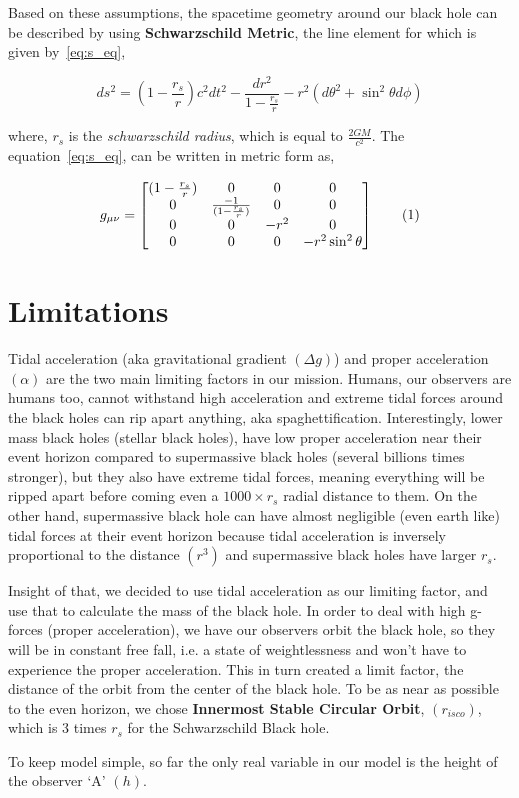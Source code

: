 Based on these assumptions, the spacetime geometry around our black hole can be described by using \textbf{Schwarzschild Metric}, the line element for which is given by~\ref{eq:s_eq}, 

\begin{equation}\label{eq:s_eq}
    ds^2  = (1 - \frac{r_s}{r})c^2dt^2 - \frac{dr^2}{1 - \frac{r_s}{r}} - r^2(d\theta^2 + \sin^2\theta d \phi) \tag{1.1}
\end{equation}

where, \(r_s\) is the \emph{schwarzschild radius}, which is equal to \(\frac{2GM}{c^2}\). The equation~\ref{eq:s_eq}, can be written in metric form as, 

\begin{equation}\label{eq:s_metric}
    g_{\mu \nu}=\begin{bmatrix}
        (1-\frac{r_s}{r}) & 0 & 0 & 0
        \cr 0 & \frac{-1}{(1-\frac{r_s}{r})} & 0 & 0
        \cr 0 & 0 & -r^2 & 0
        \cr 0 & 0 & 0 & -r^2\sin^2\theta
        \end{bmatrix}
        \tag{1}
\end{equation}

\section{Limitations}\label{sec:limitations}

Tidal acceleration (aka gravitational gradient \((\Delta g)\)) and proper acceleration \((\alpha)\) are the two main limiting factors in our mission. Humans, our observers are humans too, cannot withstand high acceleration and extreme tidal forces around the black holes can
rip apart anything, aka spaghettification. Interestingly, lower mass black holes (stellar black holes), have low proper acceleration near their event horizon compared to supermassive black holes (several billions times stronger), but they also have extreme tidal forces, meaning everything will be ripped apart before coming even a \(1000 \times r_s\)
radial distance to them. On the other hand, supermassive black hole can have almost negligible (even earth like) tidal forces at their event horizon because 
tidal acceleration is inversely proportional to the distance \((r^3)\) and supermassive black holes have larger \(r_s\).

Insight of that, we decided to use tidal acceleration as our limiting factor, and use that to calculate the mass of the black hole. In order to deal with high 
g-forces (proper acceleration), we have our observers orbit the black hole, so they will be in constant free fall, i.e. a state of weightlessness and won't have to experience
the proper acceleration. This in turn created a limit factor, the distance of the orbit from the center of the black hole. To be as near as possible to the even horizon, we 
chose \textbf{Innermost Stable Circular Orbit}, \((r_{isco})\), which is 3 times \(r_s\) for the Schwarzschild Black hole. 

To keep model simple, so far the only real variable in our model is the height of the observer `A' \((h)\). 


